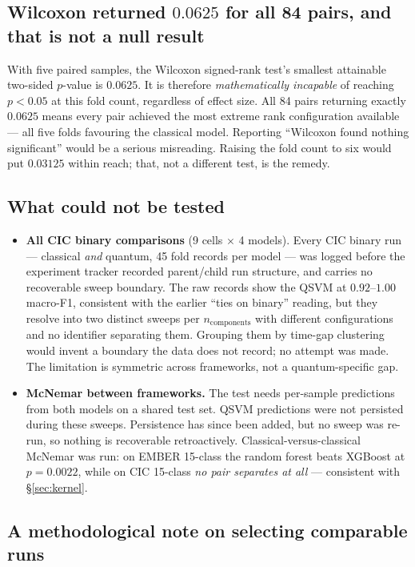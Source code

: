 \documentclass[11pt]{article}
\newcommand{\nc}{\ensuremath{n_{\mathrm{components}}}}
\begin{document}
\subsection{Wilcoxon returned $0.0625$ for all 84 pairs, and that is not a null result}

With five paired samples, the Wilcoxon signed-rank test's smallest attainable
two-sided $p$-value is $0.0625$. It is therefore \emph{mathematically incapable}
of reaching $p < 0.05$ at this fold count, regardless of effect size. All 84
pairs returning exactly $0.0625$ means every pair achieved the most extreme rank
configuration available --- all five folds favouring the classical model.
Reporting ``Wilcoxon found nothing significant'' would be a serious misreading.
Raising the fold count to six would put $0.03125$ within reach; that, not a
different test, is the remedy.

\subsection{What could not be tested}

\begin{itemize}
\item \textbf{All CIC binary comparisons} (9 cells $\times$ 4 models). Every CIC
binary run --- classical \emph{and} quantum, 45 fold records per model --- was
logged before the experiment tracker recorded parent/child run structure, and
carries no recoverable sweep boundary. The raw records show the QSVM at
$0.92$--$1.00$ macro-F1, consistent with the earlier ``ties on binary'' reading,
but they resolve into two distinct sweeps per \nc{} with different
configurations and no identifier separating them. Grouping them by time-gap
clustering would invent a boundary the data does not record; no attempt was
made. The limitation is symmetric across frameworks, not a quantum-specific gap.
\item \textbf{McNemar between frameworks.} The test needs per-sample predictions
from both models on a shared test set. QSVM predictions were not persisted
during these sweeps. Persistence has since been added, but no sweep was re-run,
so nothing is recoverable retroactively. Classical-versus-classical McNemar was
run: on EMBER 15-class the random forest beats XGBoost at $p = 0.0022$, while on
CIC 15-class \emph{no pair separates at all} --- consistent with
\S\ref{sec:kernel}.
\end{itemize}

\subsection{A methodological note on selecting comparable runs}
\end{document}
